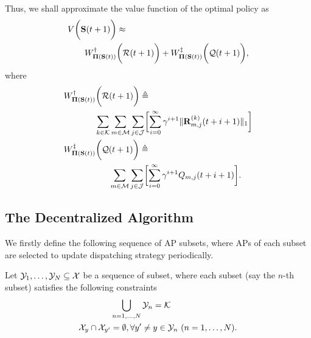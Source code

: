 Thus, we shall approximate the value function of the optimal policy as
\begin{align}
    &V\bigg(\mathbf{S}(t+1)\bigg) \approx
    \nonumber\\
    &~~~~~~W^{\dagger}_{\boldsymbol{\Pi}(\mathbf{S}(t))} \bigg(\mathcal{R}(t+1)\bigg)
    + W^{\ddagger}_{\boldsymbol{\Pi}(\mathbf{S}(t))}\bigg(\mathcal{Q}(t+1)\bigg),
\end{align}
where
\begin{align}
    &W^{\dagger}_{\Baseline(\Stat(t))} \Paren{\mathcal{R}(t+1)} \define
    \nonumber\\
    &~~~~~~~~~~~\sum_{k\in\apSet}\sum_{m\in\esSet}\sum_{j\in\jSpace}\Bracket{
        \sum_{i=0}^{\infty} \gamma^{i+1} \Inorm{\vec{R}^{(k)}_{m,j}(t+i+1)}
    }
    \\    
    &W^{\ddagger}_{\Baseline(\Stat(t))}\Paren{\mathcal{Q}(t+1)} \define
    \nonumber\\
    &~~~~~~~~~~~~~~~~\sum_{m\in\esSet}\sum_{j\in\jSpace}\Bracket{
        \sum_{i=0}^{\infty} \gamma^{i+1} Q_{m,j}(t+i+1)
    }.
\end{align}

\subsection{The Decentralized Algorithm}
\label{subsec:ap_alg}
We firstly define the following sequence of AP subsets, where APs of each subset are selected to update dispatching strategy periodically.
\begin{definition}
    Let $\mathcal{Y}_{1}, \dots, \mathcal{Y}_{N} \subseteq \mathcal{X}$ be a sequence of subset, where each subset (say the $n$-th subset) satisfies the following constraints
    \begin{align}
        &\bigcup_{n=1,\dots,N} \mathcal{Y}_{n} = \mathcal{K}
        \\
        \mathcal{X}_{y} \cap \mathcal{X}_{y'} &=\emptyset, \forall y' \neq y \in \mathcal{Y}_{n}~(n=1,\dots,N).
    \end{align}
\end{definition}

